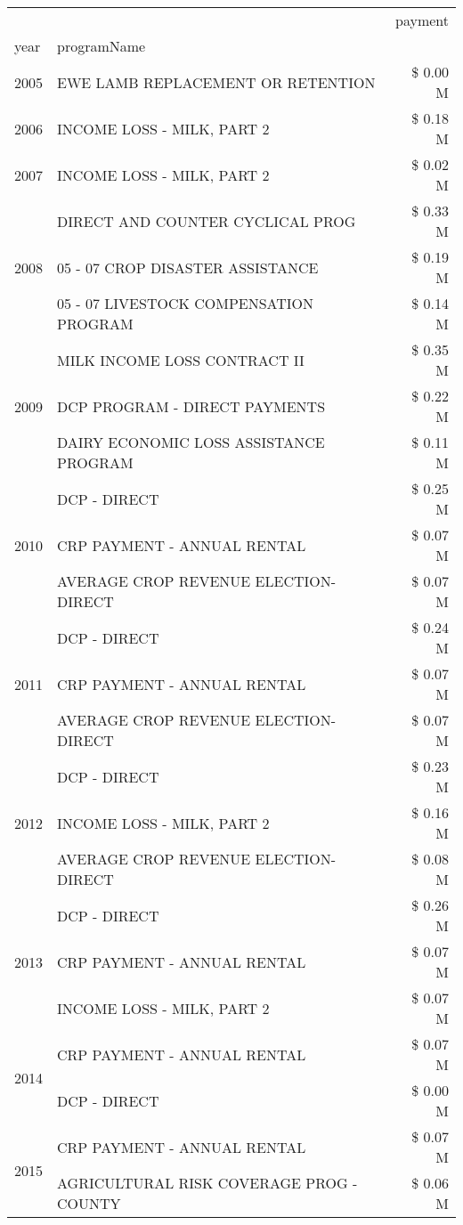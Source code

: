 \begin{tabular}{llr}
\toprule
 &  & payment \\
year & programName &  \\
\midrule
2005 & EWE LAMB REPLACEMENT OR RETENTION & \$ 0.00 M \\
\cline{1-3}
2006 & INCOME LOSS - MILK, PART 2 & \$ 0.18 M \\
\cline{1-3}
2007 & INCOME LOSS - MILK, PART 2 & \$ 0.02 M \\
\cline{1-3}
\multirow[t]{3}{*}{2008} & DIRECT AND COUNTER CYCLICAL PROG & \$ 0.33 M \\
 & 05 - 07 CROP DISASTER ASSISTANCE & \$ 0.19 M \\
 & 05 - 07 LIVESTOCK COMPENSATION PROGRAM & \$ 0.14 M \\
\cline{1-3}
\multirow[t]{3}{*}{2009} & MILK INCOME LOSS CONTRACT II & \$ 0.35 M \\
 & DCP PROGRAM - DIRECT PAYMENTS & \$ 0.22 M \\
 & DAIRY ECONOMIC LOSS ASSISTANCE PROGRAM & \$ 0.11 M \\
\cline{1-3}
\multirow[t]{3}{*}{2010} & DCP - DIRECT & \$ 0.25 M \\
 & CRP PAYMENT - ANNUAL RENTAL & \$ 0.07 M \\
 & AVERAGE CROP REVENUE ELECTION-DIRECT & \$ 0.07 M \\
\cline{1-3}
\multirow[t]{3}{*}{2011} & DCP - DIRECT & \$ 0.24 M \\
 & CRP PAYMENT - ANNUAL RENTAL & \$ 0.07 M \\
 & AVERAGE CROP REVENUE ELECTION-DIRECT & \$ 0.07 M \\
\cline{1-3}
\multirow[t]{3}{*}{2012} & DCP - DIRECT & \$ 0.23 M \\
 & INCOME LOSS - MILK, PART 2 & \$ 0.16 M \\
 & AVERAGE CROP REVENUE ELECTION-DIRECT & \$ 0.08 M \\
\cline{1-3}
\multirow[t]{3}{*}{2013} & DCP - DIRECT & \$ 0.26 M \\
 & CRP PAYMENT - ANNUAL RENTAL & \$ 0.07 M \\
 & INCOME LOSS - MILK, PART 2 & \$ 0.07 M \\
\cline{1-3}
\multirow[t]{2}{*}{2014} & CRP PAYMENT - ANNUAL RENTAL & \$ 0.07 M \\
 & DCP - DIRECT & \$ 0.00 M \\
\cline{1-3}
\multirow[t]{2}{*}{2015} & CRP PAYMENT - ANNUAL RENTAL & \$ 0.07 M \\
 & AGRICULTURAL RISK COVERAGE PROG - COUNTY & \$ 0.06 M \\

\end{tabular}
